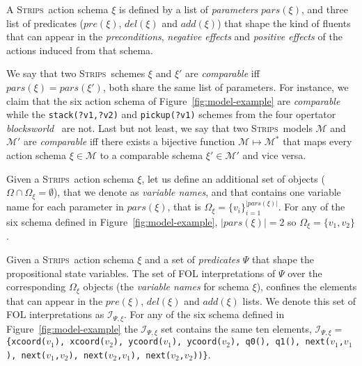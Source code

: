 \documentclass[letterpaper]{article} %
\newcommand{\strips}{\textsc{Strips}}     %
\begin{document}
A \strips\ action schema $\xi$ is defined by a list of {\em parameters} $pars(\xi)$, and three list of predicates ($pre(\xi)$, $del(\xi)$ and $add(\xi)$) that shape the kind of fluents that can appear in the {\em preconditions}, {\em negative effects} and {\em positive effects} of the actions induced from that schema.

We say that two \strips\ schemes $\xi$ and $\xi'$ are {\em comparable} iff $pars(\xi)=pars(\xi')$, both share the same list of parameters. For instance, we claim that the six action schema of Figure~\ref{fig:model-example} are {\em comparable} while the {\small\tt stack(?v1,?v2)} and {\small\tt pickup(?v1)} schemes from the four opertator {\em blocksworld}~\cite{slaney2001blocks} are not. Last but not least, we say that two \strips\ models $\mathcal{M}$ and $\mathcal{M}'$ are {\em comparable} iff there exists a bijective function $\mathcal{M} \mapsto \mathcal{M}^*$ that maps every action schema $\xi\in\mathcal{M}$ to a comparable schema $\xi'\in\mathcal{M'}$ and vice versa.

Given a \strips\ action schema $\xi$, let us define an additional set of objects ($\Omega\cap\Omega_\xi=\emptyset$), that we denote as {\em variable names}, and that contains one variable name for each parameter in $pars(\xi)$, that is $\Omega_\xi=\{v_i\}_{i=1}^{|pars(\xi)|}$. For any of the six schema defined in Figure~\ref{fig:model-example}, $|pars(\xi)|=2$ so $\Omega_\xi=\{v_1,v_2\}$.

Given a \strips\ action schema $\xi$ and a set of {\em predicates} $\Psi$ that shape the propositional state variables. The set of FOL interpretations of $\Psi$ over the corresponding $\Omega_\xi$ objects (the {\em variable names} for schema $\xi$), confines the elements that can appear in the $pre(\xi)$, $del(\xi)$ and $add(\xi)$ lists. We denote this set of FOL interpretations as ${\mathcal I}_{\Psi,\xi}$. For any of the six schema defined in Figure~\ref{fig:model-example} the ${\mathcal I}_{\Psi,\xi}$ set contains the same ten elements, ${\mathcal I}_{\Psi,\xi}=${\small\tt\{xcoord($v_1$), xcoord($v_2$), ycoord($v_1$), ycoord($v_2$), q0(), q1(), next($v_1$,$v_1$), next($v_1$,$v_2$), next($v_2$,$v_1$), next($v_2$,$v_2$))\}}.
\end{document}
